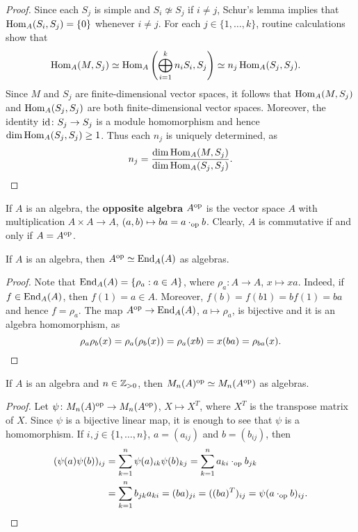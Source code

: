 \begin{proof}
	Since each $S_j$ is simple and $S_i\not\simeq S_j$ if $i\ne j$, 
    Schur's lemma implies that 
	$\operatorname{Hom}_A(S_i,S_j)=\{0\}$ whenever $i\ne j$. 
	For each $j\in\{1,\dots,k\}$, routine calculations show that 
	\begin{align*}
		\operatorname{Hom}_A(M,S_j) &\simeq \operatorname{Hom}_A\left(\bigoplus_{i=1}^k n_i S_i,S_j\right)
		\simeq n_j\operatorname{Hom}_A(S_j,S_j). 
	\end{align*} 
	Since $M$ and $S_j$ are finite-dimensional vector spaces, it follows that
	$\operatorname{Hom}_A(M,S_j)$ and $\operatorname{Hom}_A(S_j,S_j)$ 
	are both finite-dimensional vector spaces.  
	Moreover, the identity $\operatorname{id}\colon S_j\to S_j$ 
	is a module homomorphism and hence  
	$\dim\operatorname{Hom}_A(S_j,S_j)\geq 1$. 
	Thus each $n_j$ is uniquely determined, as  
	\[ 
	n_j=\frac{\dim\operatorname{Hom}_A(M,S_j)}{\dim\operatorname{Hom}_A(S_j,S_j)}.\qedhere
	\]
\end{proof}

If $A$ is an algebra, the \textbf{opposite algebra} $A^{\operatorname{op}}$ is the vector space 
$A$ with multiplication $A\times A\to A$, $(a,b)\mapsto ba=a\cdot_{\operatorname{op}}b$. Clearly,
$A$ is commutative if and only if $A=A^{\operatorname{op}}$. 

\begin{lemma}
	\label{lem:A^op}
    If $A$ is an algebra, then $A^{\operatorname{op}}\simeq\operatorname{End}_A(A)$ as algebras.  
\end{lemma}

\begin{proof}
	Note that $\operatorname{End}_A(A)=\{\rho_a:a\in A\}$, where $\rho_a\colon
	A\to A$, $x\mapsto xa$. Indeed, if $f\in\operatorname{End}_A(A)$, then 
	$f(1)=a\in A$. Moreover, $f(b)=f(b1)=bf(1)=ba$ and hence 
	$f=\rho_a$. The map $A^{\operatorname{op}}\to \operatorname{End}_A(A)$, $a\mapsto\rho_a$, 
	is bijective and it is an algebra homomorphism, as 
    \[
		\rho_a\rho_b(x)=\rho_a(\rho_b(x))=\rho_a(xb)=x(ba)=\rho_{ba}(x).\qedhere
    \]
\end{proof}

\begin{lemma}
	\label{lem:Mn_op}
	If $A$ is an algebra and $n\in\mathbb{Z}_{>0}$, then $M_n(A)^{\operatorname{op}}\simeq
	M_n(A^{\operatorname{op}})$ as algebras.   
\end{lemma}

\begin{proof}
	Let $\psi\colon M_n(A)^{\operatorname{op}}\to M_n(A^{\operatorname{op}})$, $X\mapsto X^T$,
	where $X^T$ is the transpose matrix of $X$. Since $\psi$ is a bijective linear map, it is enough
	to see that $\psi$ is a homomorphism. If $i,j\in\{1,\dots,n\}$, $a=(a_{ij})$ and $b=(b_{ij})$, then 
	\begin{align*}
		(\psi(a)\psi(b))_{ij}&=\sum_{k=1}^n \psi(a)_{ik}\psi(b)_{kj}=\sum_{k=1}^n a_{ki}\cdot_{\operatorname{op}}b_{jk}\\
		&=\sum_{k=1}^n b_{jk}a_{ki}=(ba)_{ji}=((ba)^T)_{ij}=\psi(a\cdot_{\operatorname{op}}b)_{ij}.\qedhere
	\end{align*}
\end{proof}

